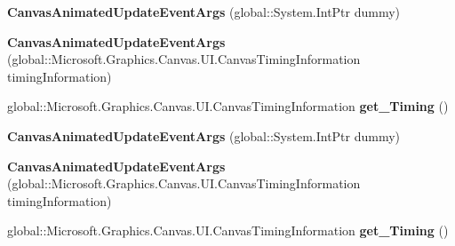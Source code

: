\begin{DoxyCompactItemize}
{\bfseries Canvas\+Animated\+Update\+Event\+Args} (global\+::\+System.\+Int\+Ptr dummy)
\item 
\mbox{\label{class_microsoft_1_1_graphics_1_1_canvas_1_1_u_i_1_1_xaml_1_1_canvas_animated_update_event_args_a33ac1d9a90ed5bc74dc911125a125018}} 
{\bfseries Canvas\+Animated\+Update\+Event\+Args} (global\+::\+Microsoft.\+Graphics.\+Canvas.\+U\+I.\+Canvas\+Timing\+Information timing\+Information)
\item 
\mbox{\label{class_microsoft_1_1_graphics_1_1_canvas_1_1_u_i_1_1_xaml_1_1_canvas_animated_update_event_args_a3386f26482966231d3a4199aaa540918}} 
global\+::\+Microsoft.\+Graphics.\+Canvas.\+U\+I.\+Canvas\+Timing\+Information {\bfseries get\+\_\+\+Timing} ()
\item 
\mbox{\label{class_microsoft_1_1_graphics_1_1_canvas_1_1_u_i_1_1_xaml_1_1_canvas_animated_update_event_args_a022ce809a253b735d009ef6a5823ad36}} 
{\bfseries Canvas\+Animated\+Update\+Event\+Args} (global\+::\+System.\+Int\+Ptr dummy)
\item 
\mbox{\label{class_microsoft_1_1_graphics_1_1_canvas_1_1_u_i_1_1_xaml_1_1_canvas_animated_update_event_args_a33ac1d9a90ed5bc74dc911125a125018}} 
{\bfseries Canvas\+Animated\+Update\+Event\+Args} (global\+::\+Microsoft.\+Graphics.\+Canvas.\+U\+I.\+Canvas\+Timing\+Information timing\+Information)
\item 
\mbox{\label{class_microsoft_1_1_graphics_1_1_canvas_1_1_u_i_1_1_xaml_1_1_canvas_animated_update_event_args_a3386f26482966231d3a4199aaa540918}} 
global\+::\+Microsoft.\+Graphics.\+Canvas.\+U\+I.\+Canvas\+Timing\+Information {\bfseries get\+\_\+\+Timing} ()
\item 
\mbox{\label{class_microsoft_1_1_graphics_1_1_canvas_1_1_u_i_1_1_xaml_1_1_canvas_animated_update_event_args_a022ce809a253b735d009ef6a5823ad36}} 

\end{DoxyCompactItemize}
